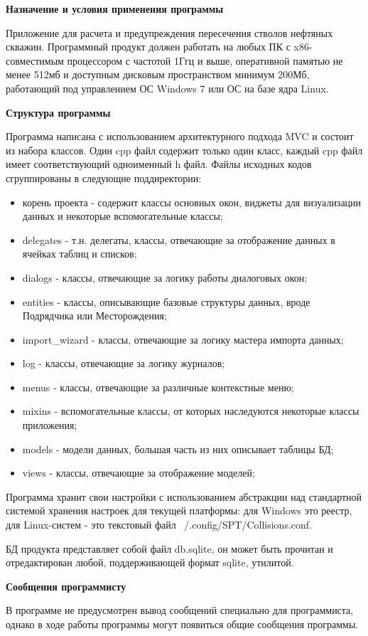 \textbf{Назначение и условия применения программы}

Приложение для расчета и предупреждения пересечения стволов нефтяных скважин.
Программный продукт должен работать на любых ПК с x86-совместимым процессором с частотой 1Ггц и выше,
оперативной памятью не менее 512мб и доступным дисковым пространством минимум 200Мб, работающий под
управлением ОС Windows 7 или ОС на базе ядра Linux.

\textbf{Структура программы}

Программа написана с использованием архитектурного подхода MVC и состоит из набора классов. Один cpp файл содержит только
один класс, каждый cpp файл имеет соответствующий одноименный h файл. Файлы исходных кодов сгруппированы в следующие
поддиректории:
\begin{itemize}
  \item корень проекта - содержит классы основных окон, виджеты для визуализации данных и некоторые вспомогательные классы;
  \item delegates - т.н. делегаты, классы, отвечающие за отображение данных в ячейках таблиц и списков;
  \item dialogs - классы, отвечающие за логику работы диалоговых окон;
  \item entities - классы, описывающие базовые структуры данных, вроде Подрядчика или Месторождения;
  \item import\_wizard - классы, отвечающие за логику мастера импорта данных;
  \item log - классы, отвечающие за логику журналов;
  \item menus - классы, отвечающие за различные контекстные меню;
  \item mixins - вспомогательные классы, от которых наследуются некоторые классы приложения;
  \item models - модели данных, большая часть из них описывает таблицы БД;
  \item views - классы, отвечающие за отображение моделей;
\end{itemize}

Программа хранит свои настройки с использованием абстракции над стандартной системой хранения настроек для текущей платформы:
для Windows это реестр, для Linux-систем - это текстовый файл ~/.config/SPT/Collisions.conf.

БД продукта представляет собой файл db.sqlite, он может быть прочитан и отредактирован любой, поддерживающей формат sqlite, утилитой.

\textbf{Сообщения программисту}

В программе не предусмотрен вывод сообщений специально для программиста, однако в ходе работы программы могут появиться
общие сообщения программы.
